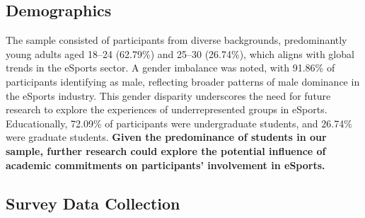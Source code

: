 \documentclass[manuscript,screen,review,anonymous]{acmart}
\begin{document}
\subsection{Demographics}


The sample consisted of participants from diverse backgrounds, predominantly young adults aged 18–24 (62.79\%) and 25–30 (26.74\%), which aligns with global trends in the eSports sector. A gender imbalance was noted, with 91.86\% of participants identifying as male, reflecting broader patterns of male dominance in the eSports industry. This gender disparity underscores the need for future research to explore the experiences of underrepresented groups in eSports. Educationally, 72.09\% of participants were undergraduate students, and 26.74\% were graduate students. \textbf{Given the predominance of students in our sample, further research could explore the potential influence of academic commitments on participants' involvement in eSports.}


\subsection{Survey Data Collection}

\end{document}
